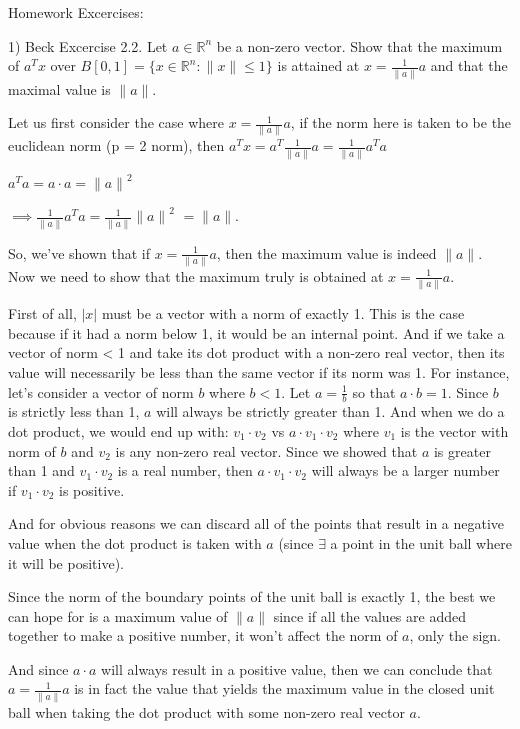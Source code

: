 \documentclass{article}
\begin{document}
Homework Excercises:

1) Beck Excercise 2.2.
Let $a \in \mathbb{R}^n$ be a non-zero vector. Show that the maximum of $a^{T}x$
over $B[0, 1] = \{x \in \mathbb{R}^n : \lVert x \rVert \leq 1\}$ is attained at
$x = \frac{1}{\lVert a \rVert}a$ and that the maximal value is $\lVert a \rVert$.

Let us first consider the case where $x = \frac{1}{\lVert a \rVert}a$,
if the norm here is taken to be the euclidean norm (p = 2 norm), then
$a^{T} x = a^{T} \frac{1}{\lVert a \rVert}a = \frac{1}{\lVert a \rVert} a^{T}a$

$a^{T} a = a \cdot a = {\lVert a \rVert}^2$

$\implies \frac{1}{\lVert a \rVert} a^{T}a =
\frac{1}{\lVert a \rVert} {\lVert a \rVert}^2$
$ = \lVert a \rVert$.

So, we've shown that if $x = \frac{1}{\lVert a \rVert} a$, then the maximum value
is indeed $\lVert a \rVert$. Now we need to show that the maximum truly is obtained
at $x = \frac{1}{\lVert a \rVert} a$.


First of all, $|x|$ must be a vector with a norm of exactly 1.
This is the case because if it had a norm below 1, it would be an internal point.
And if we take a vector of norm < 1 and take its dot product with a non-zero real vector,
then its value will necessarily be less than the same vector if its norm was 1.
For instance, let's consider a vector of norm $b$ where $b < 1$. Let $a = \frac{1}{b}$
so that $a \cdot b = 1$. Since $b$ is strictly less than 1,
$a$ will always be strictly greater than 1. And when we do a dot product,
we would end up with:
$v_1 \cdot v_2$
vs $a \cdot v_1 \cdot v_2$
where $v_1$ is the vector with norm of $b$ and $v_2$ is any non-zero real vector.
Since we showed that $a$ is greater than 1 and $v_1 \cdot v_2$ is a real number,
then $a \cdot v_1 \cdot v_2$ will always be a larger number if $v_1 \cdot v_2$
is positive.

And for obvious reasons we can discard all of the points that result in a negative value
when the dot product is taken with $a$ (since $\exists$ a
point in the unit ball where it will be positive).

Since the norm of the boundary points of the unit ball is exactly 1,
the best we can hope for is a maximum value of ${\lVert a \rVert}$
since if all the values are added together to make a positive number,
it won't affect the norm of $a$, only the sign.

And since $a \cdot a$ will always result in a positive value,
then we can conclude that $a = \frac{1}{\lVert a \rVert}a$
is in fact the value that yields the maximum value in the closed unit ball
when taking the dot product with some non-zero real vector $a$.
\end{document}
